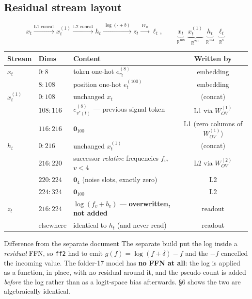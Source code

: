 \documentclass[11pt]{article}
\newcommand{\R}{\mathbb{R}}
\newcommand{\Wov}{W_{OV}}
\begin{document}
\subsection{Residual stream layout}

\[
x_t \xrightarrow{\text{L1 concat}} x^{(1)}_t \xrightarrow{\text{L2 concat}} h_t
\xrightarrow{\ \log(\cdot+b)\ } z_t \xrightarrow{\ W_u\ } \ell_t,
\qquad
\underbrace{x_t}_{\R^{108}}\ \
\underbrace{x^{(1)}_t}_{\R^{216}}\ \
\underbrace{h_t}_{\R^{324}}\ \
\underbrace{\ell_t}_{\R^{8}}
\]

\begin{center}
\begin{tabular}{@{}lllc@{}}
\toprule
\textbf{Stream} & \textbf{Dims} & \textbf{Content} & \textbf{Written by}\\
\midrule
$x_t$ & $0{:}8$ & token one-hot $e^{(8)}_{v_t}$ & embedding\\
      & $8{:}108$ & position one-hot $e^{(100)}_t$ & embedding\\
\midrule
$x^{(1)}_t$ & $0{:}108$ & unchanged $x_t$ & (concat)\\
            & $108{:}116$ & $e^{(8)}_{v^*(t)}$ --- previous signal token & L1 via $\Wov^{(1)}$\\
            & $116{:}216$ & $\bm{0}_{100}$ & L1 (zero columns of $\Wov^{(1)}$)\\
\midrule
$h_t$ & $0{:}216$ & unchanged $x^{(1)}_t$ & (concat)\\
      & $216{:}220$ & successor \emph{relative} frequencies $f_v$, $v<4$ & L2 via $\Wov^{(2)}$\\
      & $220{:}224$ & $\bm{0}_4$ (noise slots, exactly zero) & L2\\
      & $224{:}324$ & $\bm{0}_{100}$ & L2\\
\midrule
$z_t$ & $216{:}224$ & $\log(f_v+b_v)$ --- \textbf{overwritten, not added} & readout\\
      & elsewhere & identical to $h_t$ (and never read) & readout\\
\bottomrule
\end{tabular}
\end{center}

\begin{warningbox}{Difference from the separate document}
The separate build put the log inside a \emph{residual} FFN, so \texttt{ff2} had to emit
$g(f)=\log(f+\delta)-f$ and the $-f$ cancelled the incoming value. The folder-17 model has
\textbf{no FFN at all}: the log is applied as a function, in place, with no residual around it,
and the pseudo-count is added \emph{before} the log rather than as a logit-space bias afterwards.
\S6 shows the two are algebraically identical.
\end{warningbox}
\end{document}
